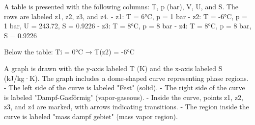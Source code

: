 A table is presented with the following columns: T, p (bar), V, U, and S. The rows are labeled z1, z2, z3, and z4.  
- z1: T = 6°C, p = 1 bar  
- z2: T = -6°C, p = 1 bar, U = 243.72, S = 0.9226  
- z3: T = 8°C, p = 8 bar  
- z4: T = 8°C, p = 8 bar, S = 0.9226  

Below the table:  
Ti = 0°C → T(z2) = -6°C  

A graph is drawn with the y-axis labeled T (K) and the x-axis labeled S (kJ/kg·K).  
The graph includes a dome-shaped curve representing phase regions.  
- The left side of the curve is labeled "Fest" (solid).  
- The right side of the curve is labeled "Dampf-Gasförmig" (vapor-gaseous).  
- Inside the curve, points z1, z2, z3, and z4 are marked, with arrows indicating transitions.  
- The region inside the curve is labeled "mass dampf gebiet" (mass vapor region).